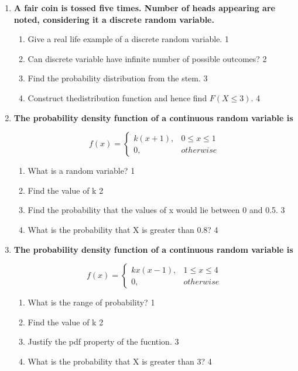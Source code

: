 \documentclass[a4paper,oneside, margin=1.4in]{book}
\begin{document}
\begin{enumerate}
  
   \item
	  \textbf{A fair coin is tossed five times. Number of heads appearing are noted, considering it a discrete random variable.} 
  
  \begin{enumerate}
    \item
	Give a real life example of a discrete random variable. \hfill 1
    \item
	Can discrete variable have infinite number of possible outcomes? \hfill 2
    \item  
	Find the probability distribution from the stem. \hfill 3
    \item
	Construct thedistribution function and hence find $F(X \le 3)$. \hfill 4
  \end{enumerate}
  
  \item
  \textbf{The probability density function of a continuous random variable is}

$$
  f(x) =
\begin{cases}
k(x+1),  & 0 \le x \le 1 \\
0, & otherwise
\end{cases}
$$

  \begin{enumerate}
    \item
	What is a random variable? \hfill 1
    \item
    	Find the value of k \hfill 2
    \item
    	Find the probability that the values of x would lie between 0 and 0.5. \hfill 3
     \item
     	What is the probability that X is greater than 0.8?  \hfill 4
  \end{enumerate}
  
    \item
  \textbf{The probability density function of a continuous random variable is}

$$
  f(x) =
\begin{cases}
kx(x-1),  & 1 \le x \le 4 \\
0, & otherwise
\end{cases}
$$

  \begin{enumerate}
    \item
	What is the range of probability? \hfill 1
    \item
    	Find the value of k \hfill 2
    \item
    	Justify the pdf property of the fucntion. \hfill 3
     \item
     	What is the probability that X is greater than 3?  \hfill 4
  \end{enumerate}



\end{enumerate}
\end{document}
